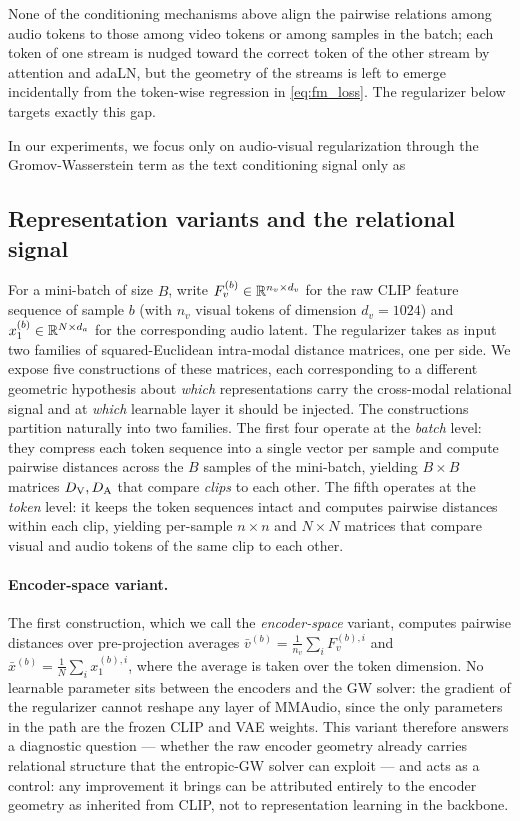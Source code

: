 None of the conditioning mechanisms above align the pairwise
relations among audio tokens to those among video tokens or among
samples in the batch; each token of one stream is nudged toward
the correct token of the other stream by attention and adaLN, but
the geometry of the streams is left to emerge incidentally from
the token-wise regression in \eqref{eq:fm_loss}. The regularizer
below targets exactly this gap.

In our experiments, we focus only on audio-visual regularization through the Gromov-Wasserstein term as the text conditioning signal only as 

\subsection{Representation variants and the relational signal}
\label{sec:methodology:reps}

For a mini-batch of size $B$, write
$F_v^{(b)} \in \mathbb{R}^{n_v \times d_v}$ for the raw CLIP feature
sequence of sample $b$ (with $n_v$ visual tokens of dimension
$d_v = 1024$) and $x_1^{(b)} \in \mathbb{R}^{N \times d_a}$ for the
corresponding audio latent. The regularizer takes as input two
families of squared-Euclidean intra-modal distance matrices, one
per side. We expose five constructions of these matrices, each
corresponding to a different geometric hypothesis about
\emph{which} representations carry the cross-modal relational
signal and at \emph{which} learnable layer it should be injected.
The constructions partition naturally into two families. The first
four operate at the \emph{batch} level: they compress each token
sequence into a single vector per sample and compute pairwise
distances across the $B$ samples of the mini-batch, yielding
$B \times B$ matrices $D_{\mathrm{V}}, D_{\mathrm{A}}$ that compare \emph{clips} to each
other. The fifth operates at the \emph{token} level: it keeps the
token sequences intact and computes pairwise distances within
each clip, yielding per-sample $n \times n$ and $N \times N$
matrices that compare visual and audio tokens of the same clip
to each other.

\paragraph{Encoder-space variant.}
The first construction, which we call the \emph{encoder-space}
variant, computes pairwise distances over pre-projection averages
$\bar v^{(b)} = \tfrac{1}{n_v} \sum_i F_v^{(b),i}$ and
$\bar x^{(b)} = \tfrac{1}{N} \sum_i x_1^{(b),i}$, where the
average is taken over the token dimension. No learnable parameter
sits between the encoders and the GW solver: the gradient of the
regularizer cannot reshape any layer of MMAudio, since the only
parameters in the path are the frozen CLIP and VAE weights. This
variant therefore answers a diagnostic question --- whether the
raw encoder geometry already carries relational structure that
the entropic-GW solver can exploit --- and acts as a control: any
improvement it brings can be attributed entirely to the encoder
geometry as inherited from CLIP, not to representation learning
in the backbone.

